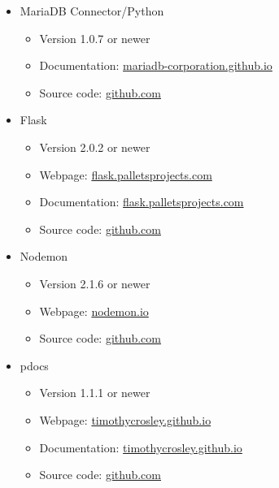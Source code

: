 \documentclass{scrreprt}
\begin{document}
\begin{itemize}
\begin{itemize}
\begin{itemize}
        \end{itemize}

        \item MariaDB Connector/Python
        \begin{itemize}

            \item Version 1.0.7 or newer
            \item Documentation: \href{https://mariadb-corporation.github.io/mariadb-connector-python/}{mariadb-corporation.github.io}
            \item Source code: \href{https://github.com/mariadb-corporation/mariadb-connector-python}{github.com}

        \end{itemize}

        \item Flask
        \begin{itemize}

            \item Version 2.0.2 or newer
            \item Webpage: \href{https://flask.palletsprojects.com/en/2.0.x/}{flask.palletsprojects.com}
            \item Documentation: \href{https://flask.palletsprojects.com/en/2.0.x/api/}{flask.palletsprojects.com}
            \item Source code: \href{https://github.com/pallets/flask}{github.com}

        \end{itemize}
        
        \item Nodemon
        \begin{itemize}
        
            \item Version 2.1.6 or newer
            \item Webpage: \href{https://nodemon.io/}{nodemon.io}
            \item Source code: \href{https://github.com/remy/nodemon}{github.com}
        
        \end{itemize}
        
        \item pdocs
        \begin{itemize}

            \item Version 1.1.1 or newer
            \item Webpage: \href{https://timothycrosley.github.io/pdocs/}{timothycrosley.github.io}
            \item Documentation: \href{https://timothycrosley.github.io/pdocs/reference/pdocs/api/}{timothycrosley.github.io}
            \item Source code: \href{https://github.com/timothycrosley/pdocs}{github.com} 


\end{itemize}
\end{itemize}
\end{itemize}
\end{document}
